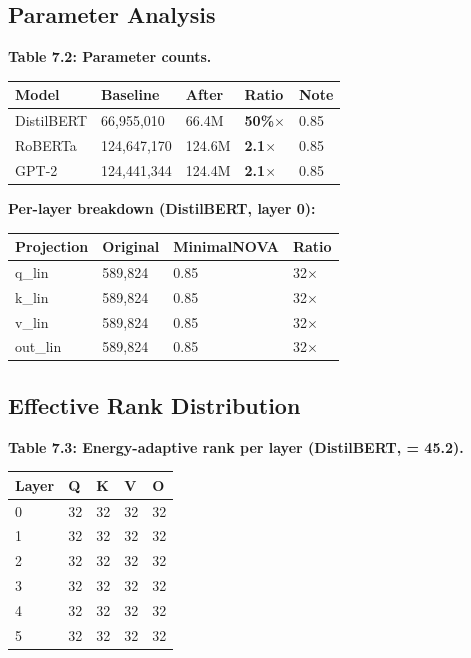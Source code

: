 \subsection{Parameter Analysis}

\textbf{Table 7.2: Parameter counts.}

\begin{table}[H]
\centering
\small
\begin{tabular}{lllll}
\toprule
\textbf{Model} & \textbf{Baseline} & \textbf{After} & \textbf{Ratio} & \textbf{Note} \\
\midrule
DistilBERT & 66,955,010 & 66.4M & \textbf{50\%$\times$} & 0.85 \\
RoBERTa & 124,647,170 & 124.6M & \textbf{2.1$\times$} & 0.85 \\
GPT-2 & 124,441,344 & 124.4M & \textbf{2.1$\times$} & 0.85 \\
\bottomrule
\end{tabular}
\end{table}

\textbf{Per-layer breakdown (DistilBERT, layer 0):}

\begin{table}[H]
\centering
\small
\begin{tabular}{llll}
\toprule
\textbf{Projection} & \textbf{Original} & \textbf{MinimalNOVA} & \textbf{Ratio} \\
\midrule
q\_lin & 589,824 & 0.85 & 32$\times$ \\
k\_lin & 589,824 & 0.85 & 32$\times$ \\
v\_lin & 589,824 & 0.85 & 32$\times$ \\
out\_lin & 589,824 & 0.85 & 32$\times$ \\
\bottomrule
\end{tabular}
\end{table}

\subsection{Effective Rank Distribution}

\textbf{Table 7.3: Energy-adaptive rank per layer (DistilBERT,   = 45.2).}

\begin{table}[H]
\centering
\small
\begin{tabular}{lllll}
\toprule
\textbf{Layer} & \textbf{Q} & \textbf{K} & \textbf{V} & \textbf{O} \\
\midrule
0 & 32 & 32 & 32 & 32 \\
1 & 32 & 32 & 32 & 32 \\
2 & 32 & 32 & 32 & 32 \\
3 & 32 & 32 & 32 & 32 \\
4 & 32 & 32 & 32 & 32 \\
5 & 32 & 32 & 32 & 32 \\
\bottomrule
\end{tabular}
\end{table}

